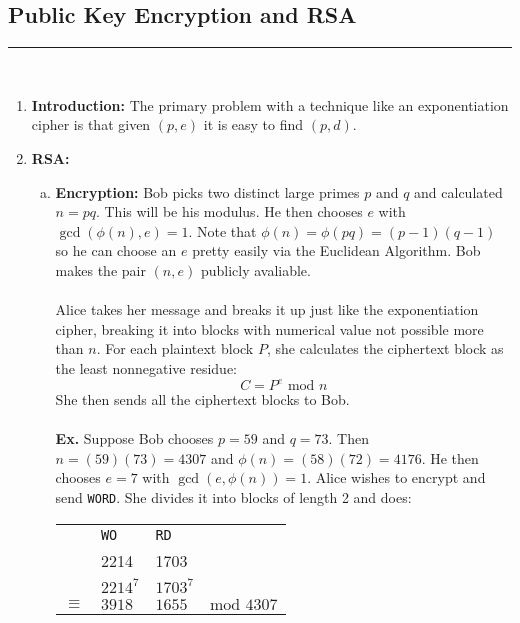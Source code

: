 \documentclass[class=article, crop=false]{standalone}
\begin{document}
\subsection{Public Key Encryption and RSA}
\rule{\textwidth}{1pt}\\
\begin{enumerate}[1.]
	\item \textbf{Introduction:} The primary problem with a 
	technique like an exponentiation cipher is that given $(p,e)$ it is
	easy to find $(p,d)$.

	\item \textbf{RSA:}
	\begin{enumerate}[(a)]
		\item \textbf{Encryption:}
		Bob picks two distinct large primes $p$ and $q$ and calculated $n=pq$. This will
		be his modulus. He then chooses $e$ with $\gcd(\phi(n),e)=1$. Note that $\phi(n)=\phi(pq)=(p-1)(q-1)$
		so he can choose an $e$ pretty easily via the Euclidean Algorithm. Bob makes the pair
		$(n,e)$ publicly avaliable.\\\\
		Alice takes her message and breaks it up just like the exponentiation cipher,
		breaking it into blocks with numerical value not possible more than $n$. For each plaintext block
		$P$, she calculates the ciphertext block as the least nonnegative residue:
		$$C = P^e\mbox{ mod } n$$
		She then sends all the ciphertext blocks to Bob.\\\\
		\textbf{Ex.} Suppose Bob chooses $p=59$ and $q=73$. Then $n=(59)(73)=4307$ and
		$\phi(n)=(58)(72)=4176$. He then chooses $e=7$ with $\gcd(e,\phi(n))=1$.
		Alice wishes to encrypt and send \verb|WORD|. She divides it into blocks of length 2 and does:
		\begin{table}[h!]
			\centering
			\begin{tabular}{c l l c}
				$ $& \verb|WO|& \verb|RD|& $ $\\
				$ $& 2214& 1703& $ $\\
				$ $& $2214^{7}$& $1703^7$& $ $\\
				\hline
				$\equiv$ &$3918$& $1655$& $\mbox{mod }4307$
			\end{tabular}
		\end{table}


\end{enumerate}
\end{enumerate}
\end{document}
